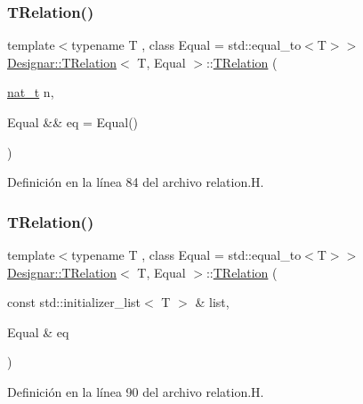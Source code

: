 \subsubsection{\texorpdfstring{T\+Relation()}{TRelation()}\hspace{0.1cm}{\footnotesize\ttfamily [2/4]}}
{\footnotesize\ttfamily template$<$typename T , class Equal  = std\+::equal\+\_\+to$<$\+T$>$$>$ \\
\hyperlink{class_designar_1_1_t_relation}{Designar\+::\+T\+Relation}$<$ T, Equal $>$\+::\hyperlink{class_designar_1_1_t_relation}{T\+Relation} (\begin{DoxyParamCaption}\item[{\hyperlink{namespace_designar_aa72662848b9f4815e7bf31a7cf3e33d1}{nat\+\_\+t}}]{n,  }\item[{Equal \&\&}]{eq = {\ttfamily Equal()} }\end{DoxyParamCaption})\hspace{0.3cm}{\ttfamily [inline]}}



Definición en la línea 84 del archivo relation.\+H.

\mbox{\label{class_designar_1_1_t_relation_a176c516d96ff9476d54b0e76497d224b}} 
\subsubsection{\texorpdfstring{T\+Relation()}{TRelation()}\hspace{0.1cm}{\footnotesize\ttfamily [3/4]}}
{\footnotesize\ttfamily template$<$typename T , class Equal  = std\+::equal\+\_\+to$<$\+T$>$$>$ \\
\hyperlink{class_designar_1_1_t_relation}{Designar\+::\+T\+Relation}$<$ T, Equal $>$\+::\hyperlink{class_designar_1_1_t_relation}{T\+Relation} (\begin{DoxyParamCaption}\item[{const std\+::initializer\+\_\+list$<$ T $>$ \&}]{list,  }\item[{Equal \&}]{eq }\end{DoxyParamCaption})\hspace{0.3cm}{\ttfamily [inline]}}



Definición en la línea 90 del archivo relation.\+H.

